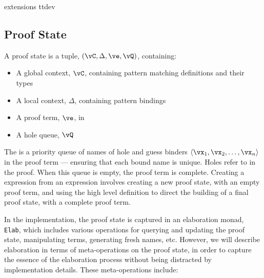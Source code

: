 {\TTdev{} extensions}
{ttdev}


\subsection{Proof State}

\label{sect:prfstate}

A proof state is a tuple, $(\vC, \Delta, \ve, \vQ)$, containing:

\begin{itemize}
\item A global context, $\vC$, containing pattern matching definitions and their types
\item A local context, $\Delta$, containing pattern bindings
\item A proof term, $\ve$, in \TTdev{}
\item A hole queue, $\vQ$
\end{itemize}

The  is a priority queue of names of hole and guess binders 
$\langle\vx_1,\vx_2,\ldots,\vx_n\rangle$
in the proof term ---
ensuring that each bound name is unique. Holes refer to 
in the proof.
When this queue is empty, the proof term is complete.
Creating a \TT{} expression from an \Idris{} expression involves creating
a new proof state, with an empty proof term, and using the high level definition
to direct the building of a final proof state, with a complete proof term.

In the implementation, the proof state is captured in an elaboration monad,
\texttt{Elab}, which includes various operations for querying and updating
the proof state, manipulating terms, generating fresh names, etc. However, we will
describe \Idris{} elaboration in terms of meta-operations on the proof state,
in order to capture the essence of the elaboration process without being distracted
by implementation details. These meta-operations include: 

